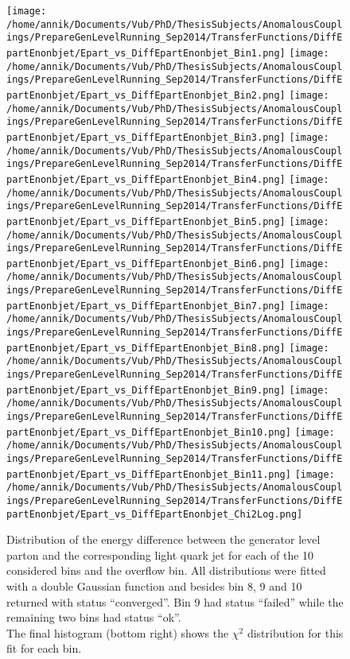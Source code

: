 \begin{figure}[!h]
  \centering
  \texttt{[image: /home/annik/Documents/Vub/PhD/ThesisSubjects/AnomalousCouplings/PrepareGenLevelRunning\_Sep2014/TransferFunctions/DiffEpartEnonbjet/Epart\_vs\_DiffEpartEnonbjet\_Bin1.png]}
  \texttt{[image: /home/annik/Documents/Vub/PhD/ThesisSubjects/AnomalousCouplings/PrepareGenLevelRunning\_Sep2014/TransferFunctions/DiffEpartEnonbjet/Epart\_vs\_DiffEpartEnonbjet\_Bin2.png]}
  \texttt{[image: /home/annik/Documents/Vub/PhD/ThesisSubjects/AnomalousCouplings/PrepareGenLevelRunning\_Sep2014/TransferFunctions/DiffEpartEnonbjet/Epart\_vs\_DiffEpartEnonbjet\_Bin3.png]}
  \texttt{[image: /home/annik/Documents/Vub/PhD/ThesisSubjects/AnomalousCouplings/PrepareGenLevelRunning\_Sep2014/TransferFunctions/DiffEpartEnonbjet/Epart\_vs\_DiffEpartEnonbjet\_Bin4.png]}
  \texttt{[image: /home/annik/Documents/Vub/PhD/ThesisSubjects/AnomalousCouplings/PrepareGenLevelRunning\_Sep2014/TransferFunctions/DiffEpartEnonbjet/Epart\_vs\_DiffEpartEnonbjet\_Bin5.png]}
  \texttt{[image: /home/annik/Documents/Vub/PhD/ThesisSubjects/AnomalousCouplings/PrepareGenLevelRunning\_Sep2014/TransferFunctions/DiffEpartEnonbjet/Epart\_vs\_DiffEpartEnonbjet\_Bin6.png]}
  \texttt{[image: /home/annik/Documents/Vub/PhD/ThesisSubjects/AnomalousCouplings/PrepareGenLevelRunning\_Sep2014/TransferFunctions/DiffEpartEnonbjet/Epart\_vs\_DiffEpartEnonbjet\_Bin7.png]}
  \texttt{[image: /home/annik/Documents/Vub/PhD/ThesisSubjects/AnomalousCouplings/PrepareGenLevelRunning\_Sep2014/TransferFunctions/DiffEpartEnonbjet/Epart\_vs\_DiffEpartEnonbjet\_Bin8.png]}
  \texttt{[image: /home/annik/Documents/Vub/PhD/ThesisSubjects/AnomalousCouplings/PrepareGenLevelRunning\_Sep2014/TransferFunctions/DiffEpartEnonbjet/Epart\_vs\_DiffEpartEnonbjet\_Bin9.png]}
  \texttt{[image: /home/annik/Documents/Vub/PhD/ThesisSubjects/AnomalousCouplings/PrepareGenLevelRunning\_Sep2014/TransferFunctions/DiffEpartEnonbjet/Epart\_vs\_DiffEpartEnonbjet\_Bin10.png]}
  \texttt{[image: /home/annik/Documents/Vub/PhD/ThesisSubjects/AnomalousCouplings/PrepareGenLevelRunning\_Sep2014/TransferFunctions/DiffEpartEnonbjet/Epart\_vs\_DiffEpartEnonbjet\_Bin11.png]}
  \texttt{[image: /home/annik/Documents/Vub/PhD/ThesisSubjects/AnomalousCouplings/PrepareGenLevelRunning\_Sep2014/TransferFunctions/DiffEpartEnonbjet/Epart\_vs\_DiffEpartEnonbjet\_Chi2Log.png]}
  \caption{Distribution of the energy difference between the generator level parton and the corresponding light quark jet for each of the 10 considered bins and the overflow bin. All distributions were fitted with a double Gaussian function and besides bin 8, 9 and 10 returned with status ``converged''. Bin 9 had status ``failed'' while the remaining two bins had status ``ok''.\\ The final histogram (bottom right) shows the $\chi^{2}$ distribution for this fit for each bin. }
\end{figure}

